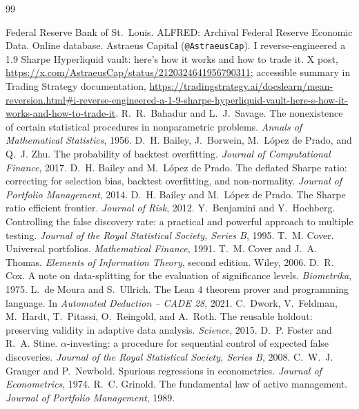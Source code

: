 \documentclass[11pt]{article}
\begin{document}
\begin{thebibliography}{99}
\small\raggedright
{} Federal Reserve Bank of St.\ Louis. ALFRED: Archival Federal Reserve Economic Data. Online database.
 Astraeus Capital (\texttt{@AstraeusCap}). I reverse-engineered a 1.9 Sharpe Hyperliquid vault: here's how it works and how to trade it. X post, \url{https://x.com/AstraeusCap/status/2120324641956790311}; accessible summary in Trading Strategy documentation, \url{https://tradingstrategy.ai/docslearn/mean-reversion.html#i-reverse-engineered-a-1-9-sharpe-hyperliquid-vault-here-s-how-it-works-and-how-to-trade-it}.
 R.~R.~Bahadur and L.~J.~Savage. The nonexistence of certain statistical procedures in nonparametric problems. \emph{Annals of Mathematical Statistics}, 1956.
 D.~H. Bailey, J.~Borwein, M.~L\'opez de Prado, and Q.~J. Zhu. The probability of backtest overfitting. \emph{Journal of Computational Finance}, 2017.
 D.~H. Bailey and M.~L\'opez de Prado. The deflated Sharpe ratio: correcting for selection bias, backtest overfitting, and non-normality. \emph{Journal of Portfolio Management}, 2014.
 D.~H. Bailey and M.~L\'opez de Prado. The Sharpe ratio efficient frontier. \emph{Journal of Risk}, 2012.
 Y.~Benjamini and Y.~Hochberg. Controlling the false discovery rate: a practical and powerful approach to multiple testing. \emph{Journal of the Royal Statistical Society, Series B}, 1995.
 T.~M. Cover. Universal portfolios. \emph{Mathematical Finance}, 1991.
 T.~M. Cover and J.~A. Thomas. \emph{Elements of Information Theory}, second edition. Wiley, 2006.
 D.~R. Cox. A note on data-splitting for the evaluation of significance levels. \emph{Biometrika}, 1975.
 L.~de Moura and S.~Ullrich. The Lean 4 theorem prover and programming language. In \emph{Automated Deduction -- CADE 28}, 2021.
 C.~Dwork, V.~Feldman, M.~Hardt, T.~Pitassi, O.~Reingold, and A.~Roth. The reusable holdout: preserving validity in adaptive data analysis. \emph{Science}, 2015.
 D.~P. Foster and R.~A. Stine. $\alpha$-investing: a procedure for sequential control of expected false discoveries. \emph{Journal of the Royal Statistical Society, Series B}, 2008.
 C.~W.~J. Granger and P.~Newbold. Spurious regressions in econometrics. \emph{Journal of Econometrics}, 1974.
 R.~C. Grinold. The fundamental law of active management. \emph{Journal of Portfolio Management}, 1989.

\end{thebibliography}
\end{document}

